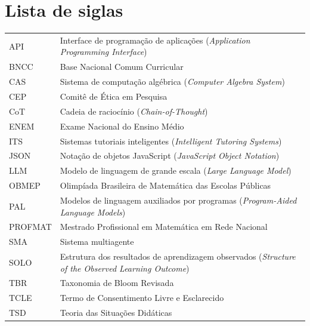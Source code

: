 
\chapter*{Lista de siglas}

\begin{tabular}{@{}lp{}@{}}
API & Interface de programação de aplicações (\emph{Application Programming Interface}) \\
BNCC & Base Nacional Comum Curricular \\
CAS & Sistema de computação algébrica (\emph{Computer Algebra System}) \\
CEP & Comitê de Ética em Pesquisa \\
CoT & Cadeia de raciocínio (\emph{Chain-of-Thought}) \\
ENEM & Exame Nacional do Ensino Médio \\
ITS & Sistemas tutoriais inteligentes (\emph{Intelligent Tutoring Systems}) \\
JSON & Notação de objetos JavaScript (\emph{JavaScript Object Notation}) \\
LLM & Modelo de linguagem de grande escala (\emph{Large Language Model}) \\
OBMEP & Olimpíada Brasileira de Matemática das Escolas Públicas \\
PAL & Modelos de linguagem auxiliados por programas (\emph{Program-Aided Language Models}) \\
PROFMAT & Mestrado Profissional em Matemática em Rede Nacional \\
SMA & Sistema multiagente \\
SOLO & Estrutura dos resultados de aprendizagem observados (\emph{Structure of the Observed Learning Outcome}) \\
TBR & Taxonomia de Bloom Revisada \\
TCLE & Termo de Consentimento Livre e Esclarecido \\
TSD & Teoria das Situações Didáticas \\
\end{tabular}
